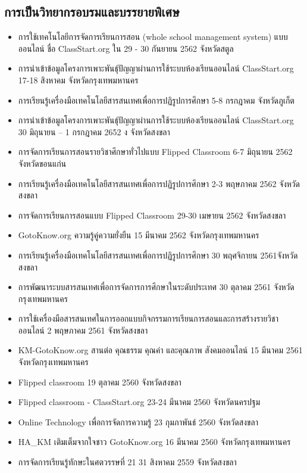 \begin{appendices}
\section*{การเป็นวิทยากรอบรมและบรรยายพิเศษ}

\begin{itemize}
	\item การใช้เทคโนโลยีการจัดการเรียนการสอน (whole school management system) แบบออนไลน์ ชื่อ ClassStart.org ใน 29 - 30 กันยายน 2562  จังหวัดสตูล
	\item การนำเข้าข้อมูลโครงการเพาะพันธุ์ปัญญาผ่านการใช้ระบบห้องเรียนออนไลน์ ClassStart.org 17-18 สิงหาคม  จังหวัดกรุงเทพมหานคร
	\item การเรียนรู้เครื่องมือเทคโนโลยีสารสนเทศเพื่อการปฏิรูปการศึกษา 5-8 กรกฎาคม  จังหวัดภูเก็ต
	\item การนำเข้าข้อมูลโครงการเพาะพันธุ์ปัญญาผ่านการใช้ระบบห้องเรียนออนไลน์ ClassStart.org 30 มิถุนายน – 1 กรกฎาคม 2652 ง จังหวัดสงขลา
	\item การจัดการเรียนการสอนรายวิชาศึกษาทั่วไปแบบ Flipped Classroom 6-7 มิถุนายน 2562  จังหวัดขอนแก่น
	\item การเรียนรู้เครื่องมือเทคโนโลยีสารสนเทศเพื่อการปฏิรูปการศึกษา 2-3 พฤษภาคม 2562  จังหวัดสงขลา
	\item การจัดการเรียนการสอนแบบ Flipped Classroom 29-30 เมษายน 2562  จังหวัดสงขลา
	\item GotoKnow.org ความรู้คู่ความยั่งยืน 15 มีนาคม 2562  จังหวัดกรุงเทพมหานคร
	\item การเรียนรู้เครื่องมือเทคโนโลยีสารสนเทศเพื่อการปฏิรูปการศึกษา 30 พฤศจิกายน 2561จังหวัดสงขลา
	\item การพัฒนาระบบสารสนเทศเพื่อการจัดการการศึกษาในระดับประเทศ 30 ตุลาคม 2561  จังหวัดกรุงเทพมหานคร
	\item การใช้เครื่องมือสารสนเทศในการออกแบบกิจกรรมการเรียนการสอนและการสร้างรายวิชาออนไลน์ 2 พฤษภาคม 2561 จังหวัดสงขลา
	\item KM-GotoKnow.org สานต่อ คุณธรรม คุณค่า และคุณภาพ สังคมออนไลน์ 15 มีนาคม 2561 จังหวัดกรุงเทพมหานคร
	\item Flipped classroom 19 ตุลาคม 2560  จังหวัดสงขลา
	\item Flipped classroom - ClassStart.org 23-24 มีนาคม 2560  จังหวัดนครปฐม
	\item Online Technology เพื่อการจัดการความรู้ 23 กุมภาพันธ์ 2560  จังหวัดสงขลา
	\item HA\_KM เติมเต็มจากใจชาว GotoKnow.org 16 มีนาคม 2560 จังหวัดกรุงเทพมหานคร
	\item การจัดการเรียนรู้ทักษะในศตวรรษที่ 21 31 สิงหาคม 2559 จังหวัดสงขลา

\end{itemize}
\end{appendices}
